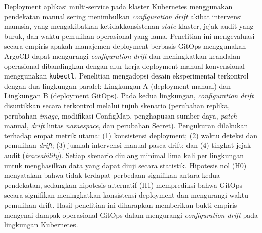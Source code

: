 \documentclass[proposal,indonesia]{ugmskripsi}
\begin{document}
\cover
\titlepageind
\approvalpage

\tableofcontents

\abstractind
Deployment aplikasi multi-service pada klaster Kubernetes menggunakan pendekatan manual sering menimbulkan \textit{configuration drift} akibat intervensi manusia, yang mengakibatkan ketidakkonsistenan \textit{state} klaster, jejak audit yang buruk, dan waktu pemulihan operasional yang lama. Penelitian ini mengevaluasi secara empiris apakah manajemen deployment berbasis GitOps menggunakan ArgoCD dapat mengurangi \textit{configuration drift} dan meningkatkan keandalan operasional dibandingkan dengan alur kerja deployment manual konvensional menggunakan \texttt{kubectl}. Penelitian mengadopsi desain eksperimental terkontrol dengan dua lingkungan paralel: Lingkungan A (deployment manual) dan Lingkungan B (deployment GitOps). Pada kedua lingkungan, \textit{configuration drift} disuntikkan secara terkontrol melalui tujuh skenario (perubahan replika, perubahan \textit{image}, modifikasi ConfigMap, penghapusan sumber daya, \textit{patch} manual, \textit{drift} lintas \textit{namespace}, dan perubahan Secret). Pengukuran dilakukan terhadap empat metrik utama: (1) konsistensi deployment; (2) waktu deteksi dan pemulihan \textit{drift}; (3) jumlah intervensi manual pasca-drift; dan (4) tingkat jejak audit (\textit{traceability}). Setiap skenario diulang minimal lima kali per lingkungan untuk menghasilkan data yang dapat diuji secara statistik. Hipotesis nol (H0) menyatakan bahwa tidak terdapat perbedaan signifikan antara kedua pendekatan, sedangkan hipotesis alternatif (H1) memprediksi bahwa GitOps secara signifikan meningkatkan konsistensi deployment dan mengurangi waktu pemulihan drift. Hasil penelitian ini diharapkan memberikan bukti empiris mengenai dampak operasional GitOps dalam mengurangi \textit{configuration drift} pada lingkungan Kubernetes.
\endabstractind
\end{document}
